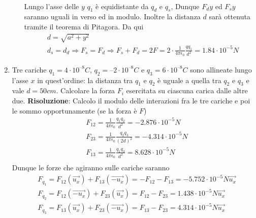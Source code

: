 \documentclass{book}
\begin{document}
\begin{enumerate}
\begin{enumerate}
\begin{align*}
        \end{align*}
        Lungo l'asse delle $y$ $q_1$ è equidistante da $q_d$ e $q_s$, Dunque $F_dy$ ed $F_sy$ saranno uguali in verso ed in modulo. Inoltre la distanza $d$ sarà ottenuta tramite il teorema di Pitagora. Da qui
        \begin{align*}
            & d = \sqrt{a^2 + y^2} \\
            & d_s = d_d \Rightarrow F_s = F_d \Rightarrow F_s + F_d = 2F = 2 \cdot \frac{1}{4 \pi \epsilon_0}\frac{q q_{1}}{d^2} = 1.84 \cdot 10^{-5} N
        \end{align*}
    \end{enumerate}

    \item Tre cariche $q_1 = 4 \cdot 10^{–8} C$, $q_2 = –2 \cdot 10^{–8} C$ e $q_3 = 6 \cdot 10^{–8} C$ sono allineate lungo l’asse $x$ in quest’ordine: la distanza tra $q_1$ e $q_2$ è uguale a quella tra $q_2$ e $q_3$ e vale $d = 50 cm$. Calcolare la forza $F_i$ esercitata su ciascuna carica dalle altre due.
    \newline
    \textbf{Risoluzione}: Calcolo il modulo delle interazioni fra le tre cariche e poi le sommo opportunamente (se la forza è $F$)
    \begin{align*}
        & F_{12} = \frac{1}{4 \pi \epsilon_0}\frac{q_{1}q_{2}}{d^2} = - 2.876 \cdot 10^{-5}N \\
        & F_{23} = \frac{1}{4 \pi \epsilon_0}\frac{q_{2}q_{3}}{(2d)^2} = -4.314 \cdot 10^{-5}N \\
        & F_{13} = \frac{1}{4 \pi \epsilon_0}\frac{q_{1}q_{3}}{d^2} = 8.628 \cdot 10^{-5}N \\
    \end{align*}
    Dunque le forze che agiranno sulle cariche saranno
    \begin{align*}
        & F_{q_1} = F_{12} (\vec{u_x}) + F_{13} (\vec{-u_x}) = - F_{12} - F_{13} = - 5.752 \cdot 10^{-5}N \vec{u_x} \\
        & F_{q_2} = F_{12} (\vec{-u_x}) + F_{23} (\vec{u_x}) = F_{12} - F_{23} = 1.438 \cdot 10^{-5}N \vec{u_x} \\
        & F_{q_3} = F_{13} (\vec{u_x}) + F_{23} (\vec{-u_x}) = F_{13} - F_{23} = 4.314 \cdot 10^{-5}N \vec{u_x} 
    \end{align*}
    

\end{enumerate}
\end{document}

